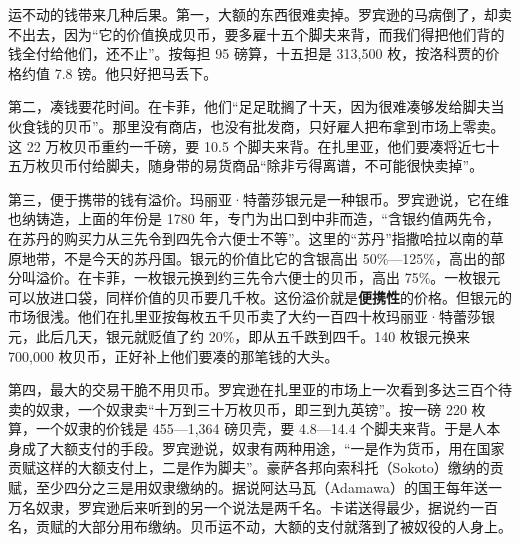 运不动的钱带来几种后果。第一，大额的东西很难卖掉。罗宾逊的马病倒了，却卖不出去，因为“它的价值换成贝币，要多雇十五个脚夫来背，而我们得把他们背的钱全付给他们，还不止”\cite{robinson1896}。按每担 95 磅算，十五担是 313,500 枚，按洛科贾的价格约值 7.8 镑。他只好把马丢下。

第二，凑钱要花时间。在卡菲，他们“足足耽搁了十天，因为很难凑够发给脚夫当伙食钱的贝币”。那里没有商店，也没有批发商，只好雇人把布拿到市场上零卖\cite{robinson1896}。这 22 万枚贝币重约一千磅，要 10.5 个脚夫来背。在扎里亚，他们要凑将近七十五万枚贝币付给脚夫，随身带的易货商品“除非亏得离谱，不可能很快卖掉”\cite{robinson1896}。

第三，便于携带的钱有溢价。玛丽亚·特蕾莎银元是一种银币。罗宾逊说，它在维也纳铸造，上面的年份是 1780 年，专门为出口到中非而造，“含银约值两先令，在苏丹的购买力从三先令到四先令六便士不等”\cite{robinson1896}。这里的“苏丹”指撒哈拉以南的草原地带，不是今天的苏丹国。银元的价值比它的含银高出 50\%—125\%，高出的部分叫溢价。在卡菲，一枚银元换到约三先令六便士的贝币，高出 75\%。一枚银元可以放进口袋，同样价值的贝币要几千枚。这份溢价就是\textbf{便携性}的价格。但银元的市场很浅。他们在扎里亚按每枚五千贝币卖了大约一百四十枚玛丽亚·特蕾莎银元，此后几天，银元就贬值了约 20\%，即从五千跌到四千\cite{robinson1896}。140 枚银元换来 700,000 枚贝币，正好补上他们要凑的那笔钱的大头。


第四，最大的交易干脆不用贝币。罗宾逊在扎里亚的市场上一次看到多达三百个待卖的奴隶，一个奴隶卖“十万到三十万枚贝币，即三到九英镑”\cite{robinson1896}。按一磅 220 枚算，一个奴隶的价钱是 455—1,364 磅贝壳，要 4.8—14.4 个脚夫来背。于是人本身成了大额支付的手段。罗宾逊说，奴隶有两种用途，“一是作为货币，用在国家贡赋这样的大额支付上，二是作为脚夫”。豪萨各邦向索科托（Sokoto）缴纳的贡赋，至少四分之三是用奴隶缴纳的。据说阿达马瓦（Adamawa）的国王每年送一万名奴隶，罗宾逊后来听到的另一个说法是两千名。卡诺送得最少，据说约一百名，贡赋的大部分用布缴纳\cite{robinson1896}。贝币运不动，大额的支付就落到了被奴役的人身上。

